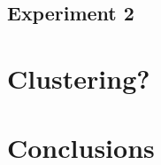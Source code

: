 \documentclass[10pt, a4paper]{article}
\begin{document}
\subsection{Experiment 2}

\section{Clustering?}

\section{Conclusions}



 
\end{document}
